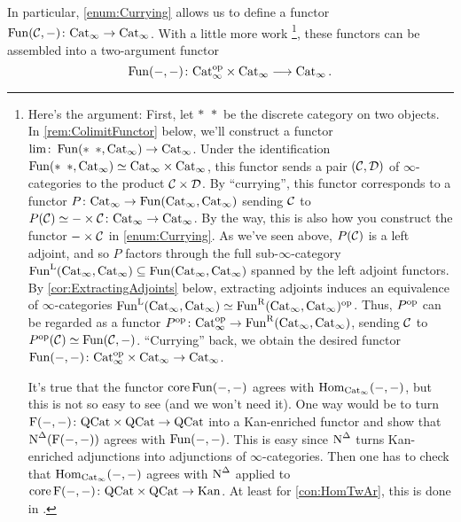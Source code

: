 \begin{exm}
	In particular, \cref{enum:Currying} allows us to define a functor $\operatorname{Fun}(\mathcal{C},-)\colon \mathrm{Cat}_\infty\rightarrow \mathrm{Cat}_\infty$. With a little more work%
	\footnote{\label{footnote:Fun}Here's the argument: First, let $*\ \,*$ be the discrete category on two objects. In \cref{rem:ColimitFunctor} below, we'll construct a functor $\lim\colon \Fun(*\ \,*,\cat{Cat}_\infty)\rightarrow \cat{Cat}_\infty$. Under the identification $\Fun(*\ \,*,\cat{Cat}_\infty)\simeq \cat{Cat}_\infty\times\cat{Cat}_\infty$, this functor sends a pair $(\mathcal{C},\mathcal{D})$ of $\infty$-categories to the product $\mathcal{C}\times\mathcal{D}$. By \enquote{currying}, this functor corresponds to a functor $P\colon \mathrm{Cat}_\infty\rightarrow \operatorname{Fun}(\mathrm{Cat}_\infty,\mathrm{Cat}_\infty)$ sending $\mathcal{C}$ to $P(\mathcal{C})\simeq -\times\mathcal{C}\colon \mathrm{Cat}_\infty\rightarrow \mathrm{Cat}_\infty$. By the way, this is also how you construct the functor $-\times\mathcal{C}$ in \cref{enum:Currying}. As we've seen above, $P(\mathcal{C})$ is a left adjoint, and so $P$ factors through the full sub-$\infty$-category $\operatorname{Fun}^{\mathrm{L}}(\mathrm{Cat}_\infty,\mathrm{Cat}_\infty)\subseteq \operatorname{Fun}(\mathrm{Cat}_\infty,\mathrm{Cat}_\infty)$ spanned by the left adjoint functors. By \cref{cor:ExtractingAdjoints} below, extracting adjoints induces an equivalence of $\infty$-categories $\operatorname{Fun}^{\mathrm{L}}(\mathrm{Cat}_\infty,\mathrm{Cat}_\infty)\simeq \operatorname{Fun}^{\mathrm{R}}(\mathrm{Cat}_\infty,\mathrm{Cat}_\infty)^{\mathrm{op}}$. Thus, $P^{\mathrm{op}}$ can be regarded as a functor $P^{\mathrm{op}}\colon \mathrm{Cat}_\infty^{\mathrm{op}}\rightarrow \operatorname{Fun}^{\mathrm{R}}(\mathrm{Cat}_\infty,\mathrm{Cat}_\infty)$, sending $\mathcal{C}$ to $P^{\mathrm{op}}(\mathcal{C})\simeq \operatorname{Fun}(\mathcal{C},-)$. \enquote{Currying} back, we obtain the desired functor $\operatorname{Fun}(-,-)\colon \mathrm{Cat}_\infty^{\mathrm{op}}\times\mathrm{Cat}_\infty\rightarrow \mathrm{Cat}_\infty$.
	
	
	It's true that the functor $\operatorname{core}\operatorname{Fun}(-,-)$ agrees with $\operatorname{Hom}_{\mathrm{Cat}_\infty}(-,-)$, but this is not so easy to see (and we won't need it). One way would be to turn $\operatorname{F}(-,-)\colon \mathrm{QCat}\times\mathrm{QCat}\rightarrow \mathrm{QCat}$ into a Kan-enriched functor and show that $\operatorname{N}^\Delta(\operatorname{F}(-,-))$ agrees with $\operatorname{Fun}(-,-)$. This is easy since $\operatorname{N}^\Delta$ turns Kan-enriched adjunctions into adjunctions of $\infty$-categories. Then one has to check that $\operatorname{Hom}_{\mathrm{Cat}_\infty}(-,-)$ agrees with $\operatorname{N}^\Delta$ applied to $\operatorname{core}\operatorname{F}(-,-)\colon\mathrm{QCat}\times\mathrm{QCat}\rightarrow \mathrm{Kan}$. At least for \cref{con:HomTwAr}, this is done in \cite[Proposition~]{HA}.}, these functors can be assembled into a two-argument functor
	\begin{equation*}
		\operatorname{Fun}(-,-)\colon \mathrm{Cat}_\infty^{\mathrm{op}}\times\mathrm{Cat}_\infty\longrightarrow \mathrm{Cat}_\infty\,.
	\end{equation*}
\end{exm}
